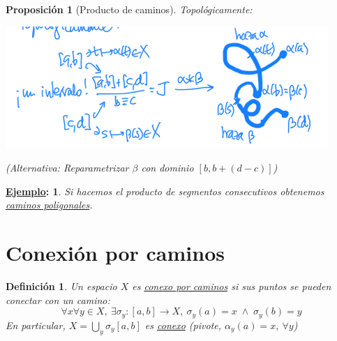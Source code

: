 \documentclass[10pt,a4paper,openright]{book}
\theoremstyle{break}
\newtheorem*{defi}{Definición}
\newtheorem*{prop}{Proposición}
\newtheorem*{ej}{\underline{Ejemplo}:}
\begin{document}
\begin{prop}[Producto de caminos]
Topológicamente: 
\begin{center}
    \includegraphics[scale=0.3]{images/prod_caminos} 
\end{center}
(Alternativa: Reparametrizar $\beta$ con dominio $\left[ b, b + \left( d - c \right) \right]$)
\end{prop}

\begin{ej}
Si hacemos el producto de segmentos consecutivos obtenemos \underline{caminos poligonales}. 
\end{ej}

\section{Conexión por caminos}%
\label{sec:conexion_por_caminos}
\begin{defi}
Un espacio $X$ es \underline{conexo por caminos} si sus puntos se pueden conectar con un camino:
\[
\forall x \forall y \in X,\ \exists \sigma_y: \left[ a, b \right] \rightarrow X,\ \sigma_y\left( a \right) = x\; \land \;\sigma_y\left( b \right) = y
\]
En particular, $X = \bigcup_{y} \sigma_y\left[ a, b \right]$ es \underline{conexo} (pivote, $\alpha_y\left( a \right) = x,\ \forall y$)
\end{defi}
\end{document}
